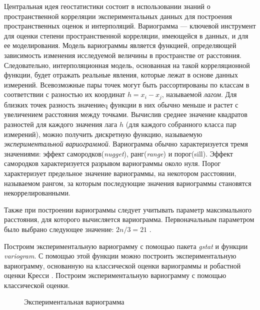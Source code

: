 Центральная идея геостатистики состоит в использовании знаний о пространственной корреляции экспериментальных данных для построения пространственных оценок и интерполяций. Вариограмма --- ключевой инструмент для оценки степени пространственной корреляции, имеющейся в данных, и для ее моделирования. Модель вариограммы является функцией, определяющей зависимость изменения исследуемой величины в пространстве от расстояния. Следовательно, интерполяционная модель, основанная на такой корреляционной функции, будет отражать реальные явления, которые лежат в основе данных измерений. Всевозможные пары точек могут быть рассортированы по классам в соответствии с разностью их координат $ h = x_i - x_j $, называемой \textit{лагом}. Для близких точек разность значениеq функции в них обычно меньше и растет с увеличением расстояния между точками. Вычислив среднее значение квадратов разностей для каждого значения лага $h$ (для каждого собранного класса пар измерений), можно получить дискретную функцию, называемую \textit{экспериментальной вариограммой}. Вариограмма обычно характеризуется тремя значениями: эффект самородков(\textit{nugget}), ранг(\textit{range}) и порог(sill). Эффект самородков характеризуется разрывом вариограммы около нуля. Порог характеризует предельное значение вариограммы, на некотором расстоянии, называемом рангом, за которым последующие значения вариограммы становятся некоррелированными.

Также при построении вариограммы следует учитывать параметр максимального расстояния, для которого вычисляется вариограмма. Первоначальным параметром было выбрано следующее значение: $ 2n / 3 = 21 $ \cite{cressie2011statistics}.

Построим экспериментальную вариограмму с помощью пакета \textit{gstat} и функции \textit{variogram}. С помощью этой функции можно построить экспериментальную вариограмму, основанную на классической оценки вариограммы и робастной оценки Кресси \cite{cressie2011statistics}. Построим экспериментальную вариограмму с помощью классической оценки.

\begin{figure}[ht]
\caption{Экспериментальная вариограмма}
\label{img:classical_emp}
\end{figure}

